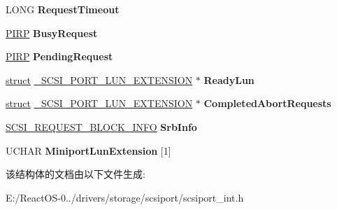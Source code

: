 \begin{DoxyCompactItemize}
L\+O\+NG {\bfseries Request\+Timeout}
\item 
\mbox{\label{struct___s_c_s_i___p_o_r_t___l_u_n___e_x_t_e_n_s_i_o_n_a88cdf464df73f8231e31d18ac56273ea}} 
\hyperlink{interfacevoid}{P\+I\+RP} {\bfseries Busy\+Request}
\item 
\mbox{\label{struct___s_c_s_i___p_o_r_t___l_u_n___e_x_t_e_n_s_i_o_n_a5976bc45d2ecba2da3e0db38d5cda904}} 
\hyperlink{interfacevoid}{P\+I\+RP} {\bfseries Pending\+Request}
\item 
\mbox{\label{struct___s_c_s_i___p_o_r_t___l_u_n___e_x_t_e_n_s_i_o_n_aa98f7a9d124c5bf4db97eb4586a7b428}} 
\hyperlink{interfacestruct}{struct} \hyperlink{struct___s_c_s_i___p_o_r_t___l_u_n___e_x_t_e_n_s_i_o_n}{\+\_\+\+S\+C\+S\+I\+\_\+\+P\+O\+R\+T\+\_\+\+L\+U\+N\+\_\+\+E\+X\+T\+E\+N\+S\+I\+ON} $\ast$ {\bfseries Ready\+Lun}
\item 
\mbox{\label{struct___s_c_s_i___p_o_r_t___l_u_n___e_x_t_e_n_s_i_o_n_aa37c7b658b31d2e794b3d1a1153db958}} 
\hyperlink{interfacestruct}{struct} \hyperlink{struct___s_c_s_i___p_o_r_t___l_u_n___e_x_t_e_n_s_i_o_n}{\+\_\+\+S\+C\+S\+I\+\_\+\+P\+O\+R\+T\+\_\+\+L\+U\+N\+\_\+\+E\+X\+T\+E\+N\+S\+I\+ON} $\ast$ {\bfseries Completed\+Abort\+Requests}
\item 
\mbox{\label{struct___s_c_s_i___p_o_r_t___l_u_n___e_x_t_e_n_s_i_o_n_a884d675bf917a524becc1da41584d139}} 
\hyperlink{struct___s_c_s_i___r_e_q_u_e_s_t___b_l_o_c_k___i_n_f_o}{S\+C\+S\+I\+\_\+\+R\+E\+Q\+U\+E\+S\+T\+\_\+\+B\+L\+O\+C\+K\+\_\+\+I\+N\+FO} {\bfseries Srb\+Info}
\item 
\mbox{\label{struct___s_c_s_i___p_o_r_t___l_u_n___e_x_t_e_n_s_i_o_n_a15aaaa36ab1281724ab164785c96d701}} 
U\+C\+H\+AR {\bfseries Miniport\+Lun\+Extension} \mbox{[}1\mbox{]}
\end{DoxyCompactItemize}


该结构体的文档由以下文件生成\+:\begin{DoxyCompactItemize}
\item 
E\+:/\+React\+O\+S-\/0../drivers/storage/scsiport/scsiport\+\_\+int.\+h\end{DoxyCompactItemize}
